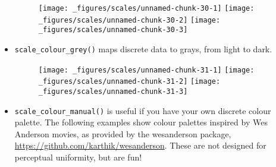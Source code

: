 \begin{itemize}
  \begin{figure}[H]
    \texttt{[image: \_figures/scales/unnamed-chunk-30-1]}%
    \texttt{[image: \_figures/scales/unnamed-chunk-30-2]}%
    \texttt{[image: \_figures/scales/unnamed-chunk-30-3]}
  \end{figure}
\item
  \texttt{scale\_colour\_grey()} maps discrete data to grays, from light
  to dark.  

\begin{Shaded}
\begin{Highlighting}[]
\OperatorTok{+}\StringTok{ }\NormalTok{()}
\OperatorTok{+}\StringTok{ }\NormalTok{(} \NormalTok{, } \NormalTok{)}
\OperatorTok{+}\StringTok{ }\NormalTok{(} \NormalTok{, } \NormalTok{)}
\end{Highlighting}
\end{Shaded}

  \begin{figure}[H]
    \texttt{[image: \_figures/scales/unnamed-chunk-31-1]}%
    \texttt{[image: \_figures/scales/unnamed-chunk-31-2]}%
    \texttt{[image: \_figures/scales/unnamed-chunk-31-3]}
  \end{figure}
\item
  \texttt{scale\_colour\_manual()} is useful if you have your own
  discrete colour palette. The following examples show colour palettes
  inspired by Wes Anderson movies, as provided by the wesanderson
  package, \url{https://github.com/karthik/wesanderson}. These are not
  designed for perceptual uniformity, but are fun!
   

\begin{Shaded}
\begin{Highlighting}[]
\OperatorTok{+}\StringTok{ }\NormalTok{(} \NormalTok{(}\NormalTok{))}
\OperatorTok{+}\StringTok{ }\NormalTok{(} \NormalTok{(}\NormalTok{))}
\OperatorTok{+}\StringTok{ }\NormalTok{(} \NormalTok{(}\NormalTok{))}
\end{Highlighting}
\end{Shaded}


\end{itemize}
